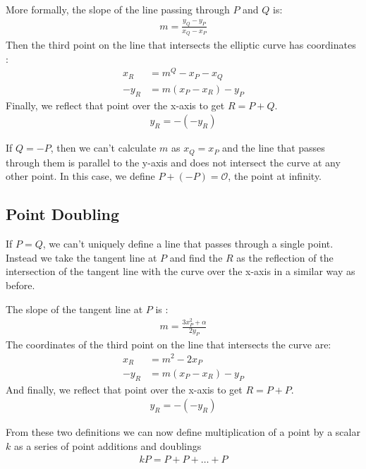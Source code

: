 \noindent
More formally, the slope of the line passing through $P$ and $Q$ is:
\begin{gather}
    m = \frac{y_Q - y_P}{x_Q - x_P}
\end{gather} 
Then the third point on the line that intersects the elliptic curve has coordinates \cite{enigbe_elliptic_curve_dlp}:
\begin{align}
    x_R &= m^Q - x_P - x_Q \\
    -y_R &= m(x_P - x_R) - y_P
\end{align}
Finally, we reflect that point over the x-axis to get $R = P + Q$.
\begin{gather}
    y_R = -(-y_R)
\end{gather}

If $Q = -P$, then we can't calculate $m$ as $x_Q = x_P$ and the line that passes through them is parallel to the y-axis and does not intersect the curve at any other point. In this case, we define $P + (-P) = \mathcal{O}$, the point at infinity.


\subsection{Point Doubling}

If $P = Q$, we can't uniquely define a line that passes through a single point. Instead we take the tangent line at $P$ and find the $R$ as the reflection of the intersection of the tangent line with the curve over the x-axis in a similar way as before.


\noindent
The slope of the tangent line at $P$ is \cite{enigbe_elliptic_curve_dlp}:
\begin{gather}
    m = \frac{3x_P^2 + \alpha}{2y_P}
\end{gather}
The coordinates of the third point on the line that intersects the curve are:
\begin{align}
    x_R &= m^2 - 2x_P \\
    -y_R &= m(x_P - x_R) - y_P
\end{align}
And finally, we reflect that point over the x-axis to get $R = P + P$.
\begin{gather}
    y_R = -(-y_R)
\end{gather}

From these two definitions we can now define multiplication of a point by a scalar $k$ as a series of point additions and doublings
\begin{gather}
    kP = P + P + \ldots + P
\end{gather}

